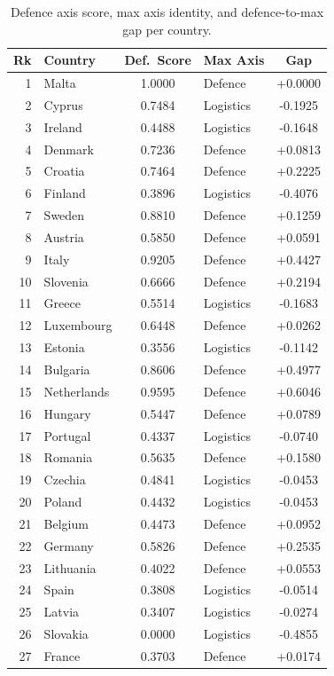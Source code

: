 \begin{table}[htbp]
\centering
\caption{Defence axis score, max axis identity, and defence-to-max gap per country.}
\label{tab:defence-gap}
\small
\setlength{\tabcolsep}{4pt}
\begin{tabular*}{\textwidth}{@{\extracolsep{\fill}}
  r l
  S[table-format=1.4]
  l
  S[table-format=+1.4]
  @{}}
\toprule
{\textbf{Rk}} & {\textbf{Country}} & {\textbf{Def.\ Score}} & {\textbf{Max Axis}} & {\textbf{Gap}} \\
 & Malta & 1.0000 & Defence & +0.0000 \\
  2 & Cyprus & 0.7484 & Logistics & -0.1925 \\
  3 & Ireland & 0.4488 & Logistics & -0.1648 \\
  4 & Denmark & 0.7236 & Defence & +0.0813 \\
  5 & Croatia & 0.7464 & Defence & +0.2225 \\
  6 & Finland & 0.3896 & Logistics & -0.4076 \\
  7 & Sweden & 0.8810 & Defence & +0.1259 \\
  8 & Austria & 0.5850 & Defence & +0.0591 \\
  9 & Italy & 0.9205 & Defence & +0.4427 \\
  10 & Slovenia & 0.6666 & Defence & +0.2194 \\
  11 & Greece & 0.5514 & Logistics & -0.1683 \\
  12 & Luxembourg & 0.6448 & Defence & +0.0262 \\
  13 & Estonia & 0.3556 & Logistics & -0.1142 \\
  14 & Bulgaria & 0.8606 & Defence & +0.4977 \\
  15 & Netherlands & 0.9595 & Defence & +0.6046 \\
  16 & Hungary & 0.5447 & Defence & +0.0789 \\
  17 & Portugal & 0.4337 & Logistics & -0.0740 \\
  18 & Romania & 0.5635 & Defence & +0.1580 \\
  19 & Czechia & 0.4841 & Logistics & -0.0453 \\
  20 & Poland & 0.4432 & Logistics & -0.0453 \\
  21 & Belgium & 0.4473 & Defence & +0.0952 \\
  22 & Germany & 0.5826 & Defence & +0.2535 \\
  23 & Lithuania & 0.4022 & Defence & +0.0553 \\
  24 & Spain & 0.3808 & Logistics & -0.0514 \\
  25 & Latvia & 0.3407 & Logistics & -0.0274 \\
  26 & Slovakia & 0.0000 & Logistics & -0.4855 \\
  27 & France & 0.3703 & Defence & +0.0174 \\
\bottomrule
\end{tabular*}
\end{table}
